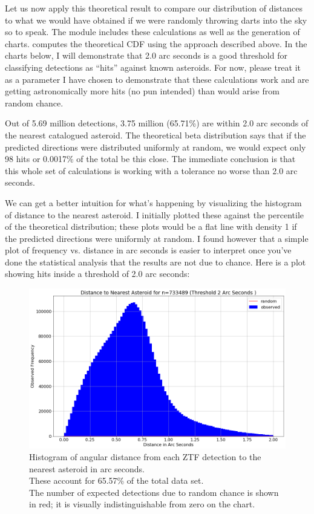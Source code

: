 Let us now apply this theoretical result to compare our distribution of distances to what we would have obtained if 
we were randomly throwing darts into the sky so to speak.
The module  includes these calculations as well as the generation of charts.
 computes the theoretical CDF using the approach described above.
In the charts below, I will demonstrate that 2.0 arc seconds is a good threshold for classifying detections as ``hits'' against known asteroids.
For now, please treat it as a parameter I have chosen to demonstrate that these calculations work and are getting
astronomically more hits (no pun intended) than would arise from random chance.

Out of 5.69 million detections, 3.75 million (65.71\%) are within 2.0 arc seconds of the nearest catalogued asteroid.
The theoretical beta distribution says that if the predicted directions were distributed uniformly at random,
we would expect only 98 hits or 0.0017\% of the total be this close.
The immediate conclusion is that this whole set of calculations is working with a tolerance no worse than 2.0 arc seconds.

We can get a better intuition for what's happening by visualizing the histogram of distance to the nearest asteroid.
I initially plotted these against the percentile of the theoretical distribution; 
these plots would be a flat line with density 1 if the predicted directions were uniformly at random.
I found however that a simple plot of frequency vs. distance in arc seconds is easier to interpret 
once you've done the statistical analysis that the results are not due to chance.
Here is a plot showing hits inside a threshold of 2.0 arc seconds:
\begin{figure}[hbt!]
\begin{center}
\includegraphics[width=1.0\textwidth]{../figs/ztf/nearest_ast_hist_dist.png}
\caption{Histogram of angular distance from each ZTF detection to the nearest asteroid in arc seconds.\\
These account for 65.57\% of the total data set.\\
The number of expected detections due to random chance is shown in red; it is visually indistinguishable from zero on the chart.}
\end{center}
\end{figure}

